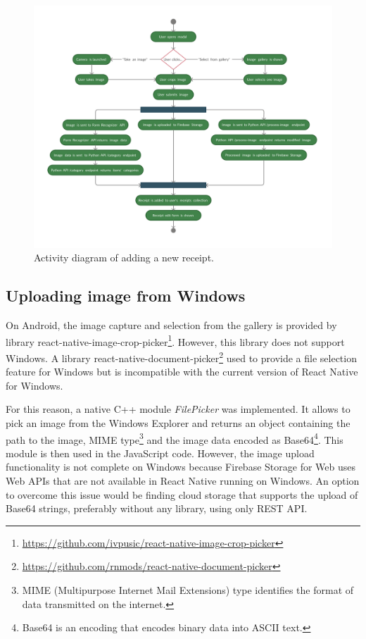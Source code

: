 \documentclass[
  printed, %
  table,   %
  oneside, %
  lof,     %
  lot,     %
]{fithesis3}
\newcommand{\definition}[1]{{#1}}
\begin{document}
\begin{figure}
    \begin{center}
        \includegraphics[width=\textwidth]{figures/diagrams/add_receipt_android}
    \end{center}
    \caption{Activity diagram of adding a new receipt.}
    \label{fig:add_receipt_android}
\end{figure}

\subsection{Uploading image from Windows}
On Android, the image capture and selection from the gallery is provided by library react-native-image-crop-picker\footnote{\url{https://github.com/ivpusic/react-native-image-crop-picker}}. However, this library does not support Windows. A library react-native-document-picker\footnote{\url{https://github.com/rnmods/react-native-document-picker}} used to provide a file selection feature for Windows but is incompatible with the current version of React Native for Windows. 

For this reason, a native C++ module \textit{FilePicker} was implemented. It allows to pick an image from the Windows Explorer and returns an object containing the path to the image, MIME type\footnote{MIME (Multipurpose Internet Mail Extensions) type identifies the format of data transmitted on the internet.} and the image data encoded as Base64\footnote{\definition{Base64} is an encoding that encodes binary data into ASCII text.}. This module is then used in the JavaScript code. However, the image upload functionality is not complete on Windows because Firebase Storage for Web uses Web APIs that are not available in React Native running on Windows. An option to overcome this issue would be finding cloud storage that supports the upload of Base64 strings, preferably without any library, using only REST API.
\end{document}
